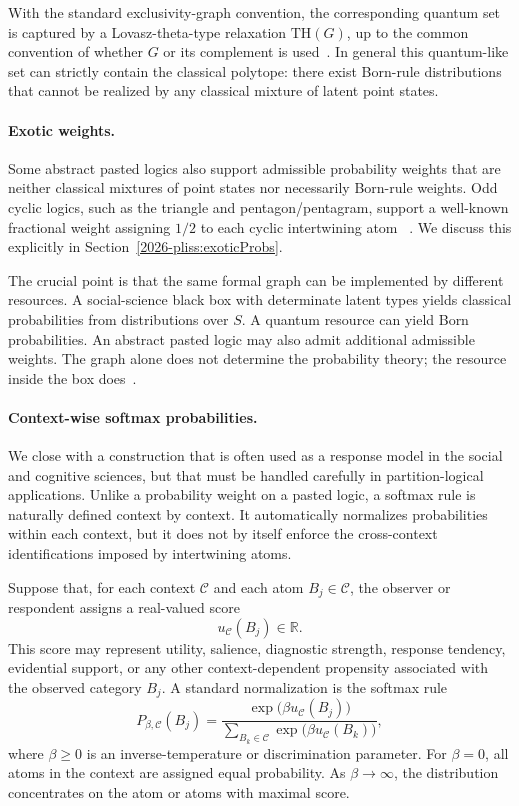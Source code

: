 \documentclass{article}
\begin{document}
With the standard exclusivity-graph convention, the corresponding
quantum set is captured by a Lovasz-theta-type relaxation
$\mathrm{TH}(G)$, up to the common convention of whether $G$ or its
complement is used~\cite{GroetschelLovaszSchrijver1986}. In general
this quantum-like set can strictly contain the classical polytope:
there exist Born-rule distributions that cannot be realized by any
classical mixture of latent point states.

\paragraph{Exotic weights.}
Some abstract pasted logics also support admissible probability
weights that are neither classical mixtures of point states nor
necessarily Born-rule weights. Odd cyclic logics, such as the
triangle and pentagon/pentagram, support a well-known fractional
weight assigning $1/2$ to each cyclic intertwining atom
~\cite{greechie-1974,wright:pent}. We discuss this explicitly in
Section~\ref{2026-pliss:exoticProbs}.

The crucial point is that the same formal graph can be implemented
by different resources. A social-science black box with determinate
latent types yields classical probabilities from distributions over
$S$. A quantum resource can yield Born probabilities. An abstract
pasted logic may also admit additional admissible weights. The graph
alone does not determine the probability theory; the resource inside
the box does~\cite{svozil-2018-b}.

\paragraph{Context-wise softmax probabilities.}
We close with a construction that is often used as a response model in
the social and cognitive sciences, but that must be handled carefully
in partition-logical applications. Unlike a probability weight on a
pasted logic, a softmax rule is naturally defined context by context.
It automatically normalizes probabilities within each context, but it
does not by itself enforce the cross-context identifications imposed
by intertwining atoms.

Suppose that, for each context \(\mathcal C\) and each atom
\(B_j\in\mathcal C\), the observer or respondent assigns a real-valued
score
\[
u_{\mathcal C}(B_j)\in\mathbb R .
\]
This score may represent utility, salience, diagnostic strength,
response tendency, evidential support, or any other context-dependent
propensity associated with the observed category \(B_j\). A standard
normalization is the softmax rule
\begin{equation}
P_{\beta,\mathcal C}(B_j)
=
\frac{\exp\bigl(\beta u_{\mathcal C}(B_j)\bigr)}
{\sum_{B_k\in\mathcal C}
 \exp\bigl(\beta u_{\mathcal C}(B_k)\bigr)} ,
\label{eq:softmax}
\end{equation}
where \(\beta\geq 0\) is an inverse-temperature or discrimination
parameter. For \(\beta=0\), all atoms in the context are assigned
equal probability. As \(\beta\to\infty\), the distribution
concentrates on the atom or atoms with maximal score.
\end{document}
